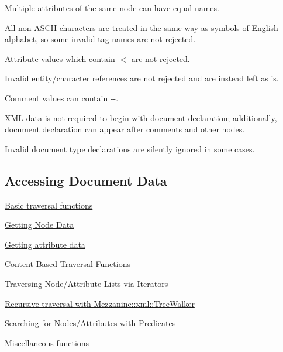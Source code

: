 \begin{DoxyItemize}
\item Multiple attributes of the same node can have equal names.
\item All non-\/ASCII characters are treated in the same way as symbols of English alphabet, so some invalid tag names are not rejected.
\item Attribute values which contain $<$ are not rejected.
\item Invalid entity/character references are not rejected and are instead left as is.
\item Comment values can contain -\/-\/.
\item XML data is not required to begin with document declaration; additionally, document declaration can appear after comments and other nodes.
\item Invalid document type declarations are silently ignored in some cases.
\end{DoxyItemize}\hypertarget{XMLManual_XMLAccessing}{}\subsection{Accessing Document Data}\label{XMLManual_XMLAccessing}

\begin{DoxyItemize}
\item \hyperlink{XMLManual_XMLAccessingBasics}{Basic traversal functions}
\item \hyperlink{XMLManual_XMLAccessingNodeData}{Getting Node Data}
\item \hyperlink{XMLManual_XMLAccessingAttributeData}{Getting attribute data}
\item \hyperlink{XMLManual_XMLAccessingContentBased}{Content Based Traversal Functions}
\item \hyperlink{XMLManual_XMLAccessingIterators}{Traversing Node/Attribute Lists via Iterators}
\item \hyperlink{XMLManual_XMLAccessingWalker}{Recursive traversal with Mezzanine::xml::TreeWalker}
\item \hyperlink{XMLManual_XMLAccessingPredicates}{Searching for Nodes/Attributes with Predicates}
\item \hyperlink{XMLManual_XMLAccessingMisc}{Miscellaneous functions}
\end{DoxyItemize}

